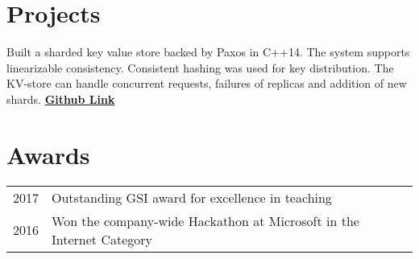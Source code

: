 \documentclass[]{deedy-resume-openfont}
\begin{document}
\begin{minipage}[t]{0.69\textwidth}

\section{Projects}
Built a sharded key value store backed by Paxos in C++14. The system supports linearizable consistency. Consistent hashing was used for key distribution. The KV-store can handle concurrent requests, failures of replicas and addition of new shards. \textbf{\href{https://github.com/pranavr93/sharded_key_value_store}{Github Link}}
\sectionsep


\section{Awards} 
\begin{tabular}{rll}
2017	     & Outstanding GSI award for excellence in teaching \\
2016	     & Won the company-wide Hackathon at Microsoft in the Internet Category \\
\end{tabular}
\sectionsep

\end{minipage} 
\end{document}
